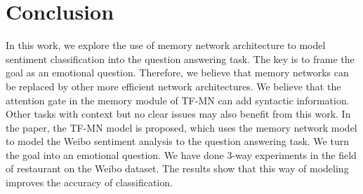 \documentclass{ieeeaccess}
\begin{document}
\begin{table}

	\caption{3-way experimental results in accuracy. 3-way represents the three polarities of posi-tive, negative, neutral. Best scores in each group are in bold.}

	\label{model-compare}

	\centering


\end{table}

\section{Conclusion}
In this work, we explore the use of memory network architecture to model sentiment classification into the question answering task. The key is to frame the goal as an emotional question. Therefore, we believe that memory networks can be replaced by other more efficient network architectures. We believe that the attention gate in the memory module of TF-MN can add syntactic information. Other tasks with context but no clear issues may also benefit from this work. In the paper, the TF-MN model is proposed, which uses the memory network model to model the Weibo sentiment analysis to the question answering task. We turn the goal into an emotional question. We have done 3-way experiments in the field of restaurant on the Weibo dataset. The results show that this way of modeling improves the accuracy of classification.




\EOD
\end{document}
